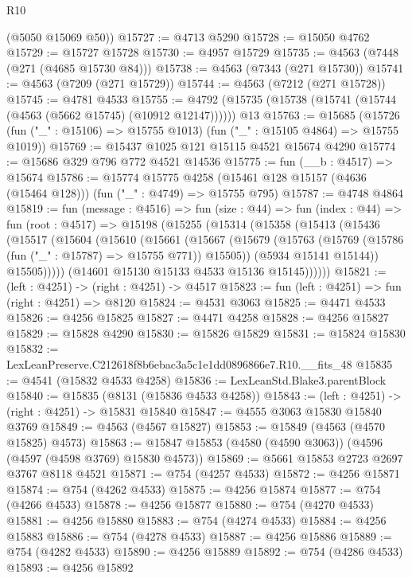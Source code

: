 \begin{lexlean}{R10}
\begin{coremodule}
      (@5050 @15069 @50))
@15727 := @4713 @5290
@15728 := @15050 @4762
@15729 := @15727 @15728
@15730 := @4957 @15729
@15735 := @4563 (@7448 (@271 (@4685 @15730 @84)))
@15738 := @4563 (@7343 (@271 @15730))
@15741 := @4563 (@7209 (@271 @15729))
@15744 := @4563 (@7212 (@271 @15728))
@15745 := @4781 @4533
@15755 := @4792 (@15735 (@15738 (@15741 (@15744 (@4563 (@5662 @15745) (@10912 @12147)))))) @13
@15763 := @15685
    (@15726 (fun ("_" : @15106) => @15755 @1013) (fun ("_" : @15105 @4864) => @15755 @1019))
@15769 := @15437 @1025 @121 @15115 @4521 @15674 @4290
@15774 := @15686 @329 @796 @772 @4521 @14536
@15775 := fun (__b : @4517) => @15674
@15786 := @15774
    @15775
    @4258
    (@15461 @128 @15157 (@4636 (@15464 @128)))
    (fun ("_" : @4749) => @15755 @795)
@15787 := @4748 @4864
@15819 := fun (message : @4516) =>
  fun (size : @44) =>
  fun (index : @44) =>
  fun (root : @4517) =>
  @15198
    (@15255
      (@15314
        (@15358
          (@15413
            (@15436
              (@15517
                (@15604
                  (@15610
                    (@15661
                      (@15667
                        (@15679
                          (@15763 (@15769 (@15786 (fun ("_" : @15787) => @15755 @771)) @15505))
                          (@5934 @15141 @15144))
                        @15505)))))
              (@14601 @15130 @15133 @4533 @15136 @15145))))))
@15821 := (left : @4251) -> (right : @4251) -> @4517
@15823 := fun (left : @4251) => fun (right : @4251) => @8120
@15824 := @4531 @3063
@15825 := @4471 @4533
@15826 := @4256 @15825
@15827 := @4471 @4258
@15828 := @4256 @15827
@15829 := @15828 @4290
@15830 := @15826 @15829
@15831 := @15824 @15830
@15832 := LexLeanPreserve.C212618f8b6ebac3a5c1e1dd0896866e7.R10.__fits_48
@15835 := @4541 (@15832 @4533 @4258)
@15836 := LexLeanStd.Blake3.parentBlock
@15840 := @15835 (@8131 (@15836 @4533 @4258))
@15843 := (left : @4251) -> (right : @4251) -> @15831 @15840
@15847 := @4555 @3063 @15830 @15840 @3769
@15849 := @4563 (@4567 @15827)
@15853 := @15849 (@4563 (@4570 @15825) @4573)
@15863 := @15847 @15853 (@4580 (@4590 @3063)) (@4596 (@4597 (@4598 @3769) @15830 @4573))
@15869 := @5661 @15853 @2723 @2697 @3767 @8118 @4521
@15871 := @754 (@4257 @4533)
@15872 := @4256 @15871
@15874 := @754 (@4262 @4533)
@15875 := @4256 @15874
@15877 := @754 (@4266 @4533)
@15878 := @4256 @15877
@15880 := @754 (@4270 @4533)
@15881 := @4256 @15880
@15883 := @754 (@4274 @4533)
@15884 := @4256 @15883
@15886 := @754 (@4278 @4533)
@15887 := @4256 @15886
@15889 := @754 (@4282 @4533)
@15890 := @4256 @15889
@15892 := @754 (@4286 @4533)
@15893 := @4256 @15892

\end{coremodule}
\end{lexlean}
